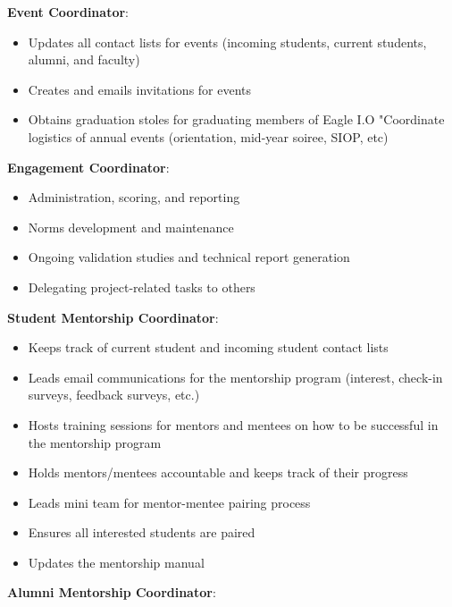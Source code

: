 \documentclass[
]{book}
\providecommand{\tightlist}{%
  \setlength{\itemsep}{0pt}\setlength{\parskip}{0pt}}
\begin{document}
\textbf{Event Coordinator}:

\begin{itemize}
\tightlist
\item
  Updates all contact lists for events (incoming students, current students, alumni, and faculty)
\item
  Creates and emails invitations for events
\item
  Obtains graduation stoles for graduating members of Eagle I.O "Coordinate logistics of annual events (orientation, mid-year soiree, SIOP, etc)
\end{itemize}

\textbf{Engagement Coordinator}:

\begin{itemize}
\tightlist
\item
  Administration, scoring, and reporting
\item
  Norms development and maintenance
\item
  Ongoing validation studies and technical report generation\\
\item
  Delegating project-related tasks to others
\end{itemize}

\textbf{Student Mentorship Coordinator}:

\begin{itemize}
\tightlist
\item
  Keeps track of current student and incoming student contact lists
\item
  Leads email communications for the mentorship program (interest, check-in surveys, feedback surveys, etc.)\\
\item
  Hosts training sessions for mentors and mentees on how to be successful in the mentorship program
\item
  Holds mentors/mentees accountable and keeps track of their progress\\
\item
  Leads mini team for mentor-mentee pairing process
\item
  Ensures all interested students are paired\\
\item
  Updates the mentorship manual
\end{itemize}

\textbf{Alumni Mentorship Coordinator}:
\end{document}
